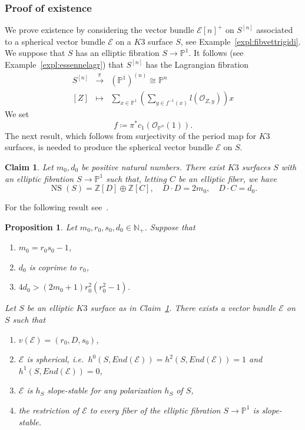 \documentclass[11pt]{amsart}
\newcommand{\NN}{{\mathbb N}}
\newcommand{\PP}{{\mathbb P}}
\newcommand{\ZZ}{{\mathbb Z}}
\let\mathcal\mathscr
\def\cE{\mathcal{E}}
\def\cO{\mathcal{O}}
\DeclareMathOperator{\NS}{NS}
\newtheorem{prp}[lmm]{Proposition}
\newtheorem*{clm}{Claim}
\theoremstyle{definition}
\theoremstyle{remark}
\begin{document}
%
\subsubsection{Proof of existence}\label{subsubsec:esiste}
%
We prove existence by considering the vector bundle $\cE[n]^{+}$ on $S^{[n]}$ associated to a spherical vector bundle $\cE$ on a $K3$ surface $S$, see 
Example~\ref{expl:fibvettrigidi}. We suppose that 
$S$ has an elliptic fibration   $S\to\PP^1$.    It follows (see Example~\ref{expl:essennelagr}) that $S^{[n]}$ has the Lagrangian fibration 
%
\begin{equation}\label{fiblagk3n}
%
\begin{matrix}
%
S^{[n]} & \xrightarrow{\pi} & (\PP^1)^{(n)}\cong\PP^n \\
%
[Z] & \mapsto & \sum_{x\in\PP^1}\left(\sum_{y\in f^{-1}(x)}l(\cO_{Z,y})\right)x
%
\end{matrix}
%
\end{equation}
%
We set
%
\begin{equation}\label{eccoeffe}
%
f\coloneqq \pi^{*}c_1(\cO_{\PP^n}(1)). 
%
\end{equation}
%
The next
result, which follows from surjectivity of the period map for $K3$ surfaces, is needed to produce the spherical vector bundle $\cE$ on  $S$.
%
\begin{clm}\label{clm:eccoell}
%
Let $m_0,d_0$ be positive natural numbers. There exist $K3$ surfaces $S$  with an elliptic fibration $S\to \PP^1$ such that, letting $C$ be  an elliptic fiber, we have
\begin{equation}\label{neronsevero}
%
\NS(S)=\ZZ[D]\oplus\ZZ[C], \quad
D\cdot D=2m_0,\quad D\cdot C=d_0.
%
\end{equation}
%
\end{clm}
%
For the following result see~\cite[Prop.~6.2]{og:fascimod}. 
%
\begin{prp}\label{prp:rigsuk}
%
Let $m_0,r_0,s_0,d_0\in\NN_{+}$. Suppose  that  
%
\begin{enumerate}
%
\item[(a)]
%
$m_0=r_0s_0-1$,
%
\item[(b)]
%
$d_0$ is  coprime to $r_0$, 
%
\item[(c)]
%
$4d_0>(2m_0+1)r_0^2(r_0^2-1)$.
%
\end{enumerate}
%
 Let $S$ be an elliptic $K3$ surface as in Claim~\ref{clm:eccoell}.
 There exists a vector bundle $\cE$ on $S$ such that
 \begin{enumerate}
%
\item
%
 $v(\cE)=(r_0,D,s_0)$,
%
\item
%
$\cE$ is spherical, i.e.~$h^0(S,End(\cE))=h^2(S,End(\cE))=1$ and $h^1(S,End(\cE))=0$,
%
\item
%
$\cE$  is $h_S$ slope-stable for any polarization $h_S$ of $S$, 
%
\item
%
the restriction of $\cE$ to \emph{every} fiber of  the  elliptic fibration $S\to \PP^1$ is slope-stable. 
% 
\end{enumerate}
%
%
\end{prp}
\end{document}
